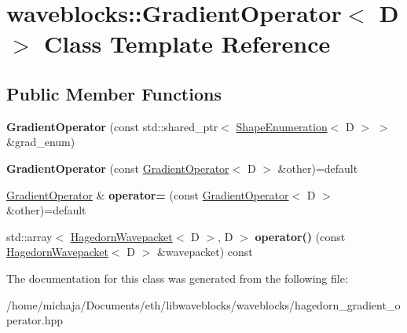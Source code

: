 \hypertarget{classwaveblocks_1_1_gradient_operator}{}\section{waveblocks\+:\+:Gradient\+Operator$<$ D $>$ Class Template Reference}
\label{classwaveblocks_1_1_gradient_operator}
\subsection*{Public Member Functions}
\begin{DoxyCompactItemize}
\item 
\hypertarget{classwaveblocks_1_1_gradient_operator_a38ca05205656b574dce4c6d99de13428}{}{\bfseries Gradient\+Operator} (const std\+::shared\+\_\+ptr$<$ \hyperlink{classwaveblocks_1_1_shape_enumeration}{Shape\+Enumeration}$<$ D $>$ $>$ \&grad\+\_\+enum)\label{classwaveblocks_1_1_gradient_operator_a38ca05205656b574dce4c6d99de13428}

\item 
\hypertarget{classwaveblocks_1_1_gradient_operator_a14e70fe090030dc57b9b55225fb4ee2f}{}{\bfseries Gradient\+Operator} (const \hyperlink{classwaveblocks_1_1_gradient_operator}{Gradient\+Operator}$<$ D $>$ \&other)=default\label{classwaveblocks_1_1_gradient_operator_a14e70fe090030dc57b9b55225fb4ee2f}

\item 
\hypertarget{classwaveblocks_1_1_gradient_operator_a873a9ee5c453ac5bb426da0b1c16d9aa}{}\hyperlink{classwaveblocks_1_1_gradient_operator}{Gradient\+Operator} \& {\bfseries operator=} (const \hyperlink{classwaveblocks_1_1_gradient_operator}{Gradient\+Operator}$<$ D $>$ \&other)=default\label{classwaveblocks_1_1_gradient_operator_a873a9ee5c453ac5bb426da0b1c16d9aa}

\item 
\hypertarget{classwaveblocks_1_1_gradient_operator_a21e784ff2341dc0d04c51b9bace48f65}{}std\+::array$<$ \hyperlink{classwaveblocks_1_1_hagedorn_wavepacket}{Hagedorn\+Wavepacket}$<$ D $>$, D $>$ {\bfseries operator()} (const \hyperlink{classwaveblocks_1_1_hagedorn_wavepacket}{Hagedorn\+Wavepacket}$<$ D $>$ \&wavepacket) const \label{classwaveblocks_1_1_gradient_operator_a21e784ff2341dc0d04c51b9bace48f65}

\end{DoxyCompactItemize}


The documentation for this class was generated from the following file\+:\begin{DoxyCompactItemize}
\item 
/home/michaja/\+Documents/eth/libwaveblocks/waveblocks/hagedorn\+\_\+gradient\+\_\+operator.\+hpp\end{DoxyCompactItemize}

